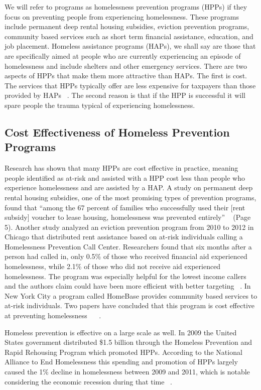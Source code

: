 \documentclass[10pt,letterpaper]{article}
\begin{document}
We will refer to programs as homelessness prevention programs (HPPs) if they focus on preventing people from experiencing homelessness. These programs include permanent deep rental housing subsidies, eviction prevention programs, community based services such as short term financial assistance, education, and job placement. Homeless assistance programs (HAPs), we shall say are those that are specifically aimed at people who are currently experiencing an episode of homelessness and include shelters and other emergency services. There are two aspects of HPPs that make them more attractive than HAPs. The first is cost. The services that HPPs typically offer are less expensive for taxpayers than those provided by HAPs ~\cite{shinn2019homelessness}. The second reason is that if the HPP is successful it will spare people the trauma typical of experiencing homelessness.

\subsection*{Cost Effectiveness of Homeless Prevention Programs}
Research has shown that many HPPs are cost effective in practice, meaning people identified as at-risk and assisted with a HPP cost less than people who experience homelessness and are assisted by a HAP. A study on permanent deep rental housing subsidies, one of the most promising types of prevention programs, found that ``among the 67 percent of families who successfully used their [rent subsidy] voucher to lease housing, homelessness was prevented entirely'' ~\cite{shinn2019homelessness} (Page 5). Another study analyzed an eviction prevention program from 2010 to 2012 in Chicago that distributed rent assistance based on at-risk individuals calling a Homelessness Prevention Call Center. Researchers found that six months after a person had called in, only 0.5\% of those who received financial aid experienced homelessness, while 2.1\% of those who did not receive aid experienced homelessness. The program was especially helpful for the lowest income callers and the authors claim could have been more efficient with better targeting ~\cite{evans2016impact}. In New York City a program called HomeBase provides community based services to at-risk individuals. Two papers have concluded that this program is cost effective at preventing homelessness ~\cite{rolston2013evaluation} ~\cite{goodman2016homelessness}. 

Homeless prevention is effective on a large scale as well. In 2009 the United States government distributed \$1.5 billion through the Homeless Prevention and Rapid Rehousing Program which promoted HPPs. According to the National Alliance to End Homelessness this spending and promotion of HPPs largely caused the 1\% decline in homelessness between 2009 and 2011, which is notable considering the economic recession during that time ~\cite{shinn2013efficient}.
\end{document}
